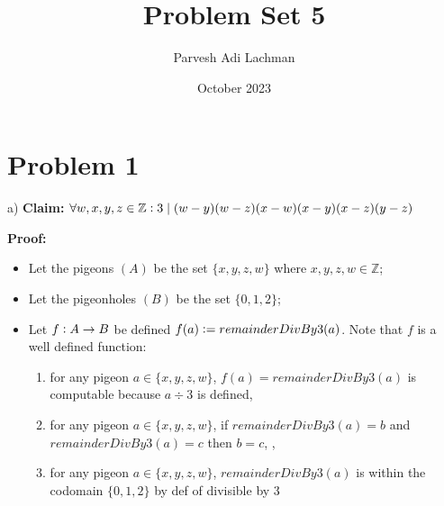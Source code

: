 \documentclass{article}
\title{Problem Set 5}
\author{Parvesh Adi Lachman}
\date{October 2023}
\begin{document}
\maketitle

\section{Problem 1}


a) \textbf{Claim:} $\forall w,x,y,z\in\mathbb{Z}\vcentcolon  3\mid (w-y)(w-z)(x-w)(x-y)(x-z)(y-z)$ \vspace{10pt}


\textbf{Proof:}\vspace{5pt}

\begin{itemize}
	\item Let the pigeons $(A)$ be the set $\{x,y,z,w\}$ where $x,y,z,w\in\mathbb{Z}$;
	\item Let the pigeonholes $(B)$ be the set $\{0,1,2\}$;
	\item Let $f\vcentcolon A\rightarrow B$ be defined $f(a)\vcentcolon = remainderDivBy3(a)$. Note that $f$ is a well defined function:
		\begin{enumerate}
			\item for any pigeon $a\in \{x,y,z,w\}$, $f(a)=remainderDivBy3(a)$ is computable because $a\div 3$ is defined,
			\item for any pigeon $a\in \{x,y,z,w\}$, if $remainderDivBy3(a)=b$ and $remainderDivBy3(a)=c$ then $b=c$, ,
			\item for any pigeon $a\in \{x,y,z,w\}$, $remainderDivBy3(a)$ is within the codomain $\{0,1,2\}$ by def of divisible by 3
		\end{enumerate}

\end{itemize}
\end{document}

